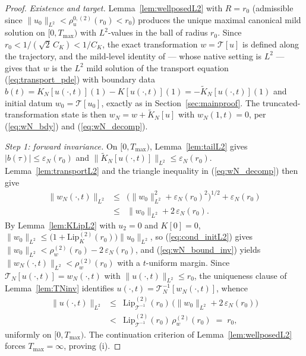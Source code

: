 \documentclass[amsthm]{autart}
\theoremstyle{plain}
\theoremstyle{definition}
\newcommand{\Tcal}{\mathcal{T}}
\newcommand{\Ltwo}{L^2}
\newcommand{\Lipk}{\mathrm{Lip}_K}
\newcommand{\LipT}{\mathrm{Lip}_{\Tcal^{-1}}}
\newcommand{\eps}{\varepsilon}
\begin{document}
\begin{proof}
\emph{Existence and target.} Lemma~\ref{lem:wellposedL2} with $R = r_0$ (admissible since $\|u_0\|_{\Ltwo} < \rho_u^{0,(2)}(r_0) < r_0$) produces the unique maximal canonical mild solution on $[0, T_{\max})$ with $\Ltwo$-values in the ball of radius $r_0$. Since $r_0 < 1/(\sqrt{2}\,C_K) < 1/C_K$, the exact transformation $w = \Tcal[u]$ is defined along the trajectory, and the mild-level identity of \cite{krstic2026feedbacklinearizationhyperbolicpdes} --- whose native setting is $\Ltwo$ --- gives that $w$ is the $\Ltwo$ mild solution of the transport equation (\ref{eq:transport_pde}) with boundary data $b(t) = K_N[u(\cdot,t)](1) - K[u(\cdot,t)](1) = -\widetilde K_N[u(\cdot,t)](1)$ and initial datum $w_0 = \Tcal[u_0]$, exactly as in Section~\ref{sec:mainproof}. The truncated-transformation state is then $w_N = w + \widetilde K_N[u]$ with $w_N(1,t) = 0$, per (\ref{eq:wN_bdy}) and (\ref{eq:wN_decomp}).

\emph{Step 1: forward invariance.} On $[0, T_{\max})$, Lemma~\ref{lem:tailL2} gives $|b(\tau)| \le \eps_N(r_0)$ and $\|\widetilde K_N[u(\cdot,t)]\|_{\Ltwo} \le \eps_N(r_0)$. Lemma~\ref{lem:transportL2} and the triangle inequality in (\ref{eq:wN_decomp}) then give
\begin{eqnarray}
\|w_N(\cdot,t)\|_{\Ltwo} &\le& \bigl(\|w_0\|_{\Ltwo}^2 + \eps_N(r_0)^2\bigr)^{1/2} + \eps_N(r_0) \nonumber \\
&\le& \|w_0\|_{\Ltwo} + 2\,\eps_N(r_0).
\label{eq:wN_bound_inv}
\end{eqnarray}
By Lemma~\ref{lem:KLipL2} with $u_2 = 0$ and $K[0] = 0$, $\|w_0\|_{\Ltwo} \le \bigl(1 + \Lipk^{(2)}(r_0)\bigr)\|u_0\|_{\Ltwo}$, so (\ref{eq:cond_initL2}) gives $\|w_0\|_{\Ltwo} < \rho_w^{(2)}(r_0) - 2\,\eps_N(r_0)$, and (\ref{eq:wN_bound_inv}) yields $\|w_N(\cdot,t)\|_{\Ltwo} < \rho_w^{(2)}(r_0)$ with a $t$-uniform margin. Since $\Tcal_N[u(\cdot,t)] = w_N(\cdot,t)$ with $\|u(\cdot,t)\|_{\Ltwo} \le r_0$, the uniqueness clause of Lemma~\ref{lem:TNinv} identifies $u(\cdot,t) = \Tcal_N^{-1}[w_N(\cdot,t)]$, whence
\begin{eqnarray}
\|u(\cdot,t)\|_{\Ltwo} &\le& \LipT^{(2)}(r_0)\,\bigl(\|w_0\|_{\Ltwo} + 2\,\eps_N(r_0)\bigr) \nonumber \\
&<& \LipT^{(2)}(r_0)\,\rho_w^{(2)}(r_0) \;=\; r_0,
\label{eq:u_margin_L2}
\end{eqnarray}
uniformly on $[0, T_{\max})$. The continuation criterion of Lemma~\ref{lem:wellposedL2} forces $T_{\max} = \infty$, proving (i).


\end{proof}
\end{document}
